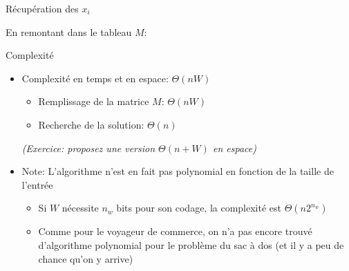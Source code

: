 \begin{frame}{Récupération des $x_i$}

En remontant dans le tableau $M$:

{\small
\begin{center}
\end{center}
}

\end{frame}

\begin{frame}{Complexité}

\begin{itemize}
\item Complexité en temps et en espace: $\Theta(n W)$
\begin{itemize}
\item Remplissage de la matrice $M$: $\Theta(n W)$
\item Recherche de la solution: $\Theta(n)$
\end{itemize}
{\it (Exercice: proposez une version $\Theta(n+W)$ en espace)}

\bigskip

\item Note: L'algorithme n'est en fait pas polynomial en fonction de la taille de l'entrée
\begin{itemize}
\item Si $W$ nécessite $n_w$ bits pour son codage, la complexité est $\Theta(n 2^{n_w})$
\item Comme pour le voyageur de commerce, on n'a pas encore trouvé d'algorithme polynomial pour le problème du sac à dos (et il y a peu de chance qu'on y arrive)
\end{itemize}
\end{itemize}
\end{frame}

